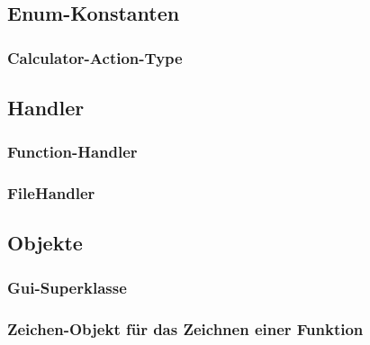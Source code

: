 \documentclass[12pt,a4paper]{article}
\newcommand{\project}{/home/jonas/Dokumente/Java-Projekte/GraphingCalculator/src/main/java/de/jonas/graphingcalculator}
\begin{document}
    \newpage

    \subsection{Enum-Konstanten}

    \subsubsection{Calculator-Action-Type}
    

    \newpage

    \subsection{Handler}

    \subsubsection{Function-Handler}
    

    \newpage

    \subsubsection{FileHandler}
    

    \newpage

    \subsection{Objekte}

    \subsubsection{Gui-Superklasse}
    

    \newpage

    \subsubsection{Zeichen-Objekt für das Zeichnen einer Funktion}
    
\end{document}
